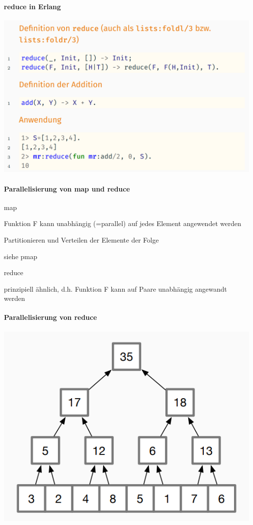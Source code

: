 \documentclass[10pt]{article}
\begin{document}
\paragraph{reduce in Erlang}

\begin{center}
  \includegraphics[width=0.4\linewidth]{Assets/Programmierparadigmen-erlang-reduce}
\end{center}

\paragraph{Parallelisierung von map und reduce}

\color{orange} map \color{black}
\begin{itemize*}
  \item Funktion F kann unabhängig (=parallel) auf jedes Element angewendet werden
  \item Partitionieren und Verteilen der Elemente der Folge
  \item siehe pmap
\end{itemize*}
\color{orange} reduce \color{black}
\begin{itemize*}
  \item prinzipiell ähnlich, d.h. Funktion F kann auf Paare unabhängig angewandt werden
\end{itemize*}

\paragraph{Parallelisierung von reduce}

\begin{center}
  \includegraphics[width=0.5\linewidth]{Assets/Programmierparadigmen-erlang-reduce-parallel}
\end{center}
\end{document}
